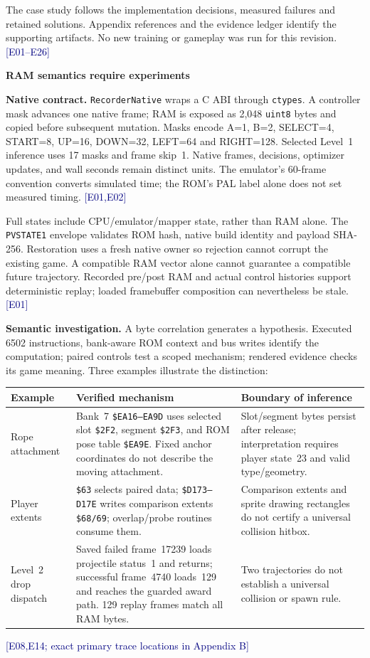 \documentclass[11pt,a4paper]{article}
\newcommand{\topic}[2]{\vspace*{-4mm}{\small\color{teal}\textbf{#1}}\par{\LARGE\bfseries #2}\par\vspace{3mm}}
\newcommand{\ev}[1]{{\small\textcolor{navy}{[#1]}}}
\newcommand{\pathref}[1]{\nolinkurl{#1}}
\begin{document}
The case study follows the implementation decisions, measured failures and retained solutions. Appendix references and the evidence ledger identify the supporting artifacts. No new training or gameplay was run for this revision. \ev{E01--E26}

\newpage
\topic{02 / MEASUREMENT}{RAM semantics require experiments}
\textbf{Native contract.} \pathref{RecorderNative} wraps a C ABI through \pathref{ctypes}. A controller mask advances one native frame; RAM is exposed as 2,048 \pathref{uint8} bytes and copied before subsequent mutation. Masks encode A=1, B=2, SELECT=4, START=8, UP=16, DOWN=32, LEFT=64 and RIGHT=128. Selected Level~1 inference uses 17 masks and frame skip~1. Native frames, decisions, optimizer updates, and wall seconds remain distinct units. The emulator's 60-frame convention converts simulated time; the ROM's PAL label alone does not set measured timing. \ev{E01,E02}

Full states include CPU/emulator/mapper state, rather than RAM alone. The \pathref{PVSTATE1} envelope validates ROM hash, native build identity and payload SHA-256. Restoration uses a fresh native owner so rejection cannot corrupt the existing game. A compatible RAM vector alone cannot guarantee a compatible future trajectory. Recorded pre/post RAM and actual control histories support deterministic replay; loaded framebuffer composition can nevertheless be stale. \ev{E01}

\textbf{Semantic investigation.} A byte correlation generates a hypothesis. Executed 6502 instructions, bank-aware ROM context and bus writes identify the computation; paired controls test a scoped mechanism; rendered evidence checks its game meaning. Three examples illustrate the distinction:

\begin{tabularx}{\linewidth}{@{}P{27mm}Y Y@{}}\toprule
Example & Verified mechanism & Boundary of inference\\\midrule
Rope attachment & Bank~7 \texttt{\$EA16--EA9D} uses selected slot \texttt{\$2F2}, segment \texttt{\$2F3}, and ROM pose table \texttt{\$EA9E}. Fixed anchor coordinates do not describe the moving attachment. & Slot/segment bytes persist after release; interpretation requires player state~23 and valid type/geometry.\\
Player extents & \texttt{\$63} selects paired data; \texttt{\$D173--D17E} writes comparison extents \texttt{\$68/69}; overlap/probe routines consume them. & Comparison extents and sprite drawing rectangles do not certify a universal collision hitbox.\\
Level~2 drop dispatch & Saved failed frame~17239 loads projectile status~1 and returns; successful frame~4740 loads~129 and reaches the guarded award path. 129 replay frames match all RAM bytes. & Two trajectories do not establish a universal collision or spawn rule.\\\bottomrule
\end{tabularx}
\ev{E08,E14; exact primary trace locations in Appendix B}
\end{document}
